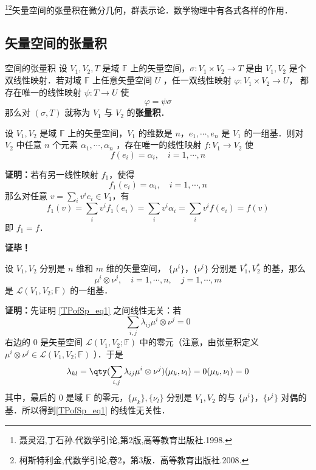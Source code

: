 

\footnote{聂灵沼,丁石孙.代数学引论,第2版,高等教育出版社.1998.}\footnote{柯斯特利金,代数学引论,卷2，第3版．高等教育出版社.2008.}矢量空间的张量积在微分几何，群表示论．数学物理中有各式各样的作用．
\subsection{矢量空间的张量积}
\begin{definition}{空间的张量积}\label{TPofSp_def1}
设 $V_1,V_2,T$ 是域 $\mathbb F$ 上的矢量空间，$\sigma:V_1\times V_2\rightarrow T$ 是由 $V_1,V_2$ 是个双线性映射．若对域 $\mathbb F$ 上任意矢量空间 $U$ ，任一双线性映射 $\varphi:V_1\times V_2\rightarrow U$， 都存在唯一的线性映射 $\psi:T\rightarrow U$ 使
\begin{equation}
\varphi=\psi\sigma
\end{equation}
那么对 $(\sigma,T)$ 就称为 $V_1$ 与 $V_2$ 的\textbf{张量积}．
\end{definition}

\begin{lemma}{}\label{TPofSp_lem2}
设 $V_1,V_2$ 是域 $\mathbb F$ 上的矢量空间，$V_1$ 的维数是 $n$，$e_1,\cdots,e_n$ 是 $V_1$ 的一组基．则对 $V_2$ 中任意 $n$ 个元素 $\alpha_1,\cdots,\alpha_n$ ，存在唯一的线性映射 $f:V_1\rightarrow V_2$ 使
\begin{equation}
f(e_i)=\alpha_i,\quad i=1,\cdots,n
\end{equation}
\end{lemma}
\textbf{证明：}若有另一线性映射 $f_1$，使得
\begin{equation}
f_1(e_i)=\alpha_i,\quad i=1,\cdots ,n
\end{equation}
那么对任意 $v=\sum\limits_{i}v^ie_i\in V_1$，有
\begin{equation}
f_1(v)=\sum_{i}v^if_1(e_i)=\sum_{i}v^i\alpha_i=\sum_{i}v^if(e_i)=f(v)
\end{equation}
即 $f_1=f$．

\textbf{证毕！}
\begin{lemma}{}\label{TPofSp_lem1}
设 $V_1,V_2$ 分别是 $n$ 维和 $m$ 维的矢量空间， $\{\mu^i\}$，$\{\nu^i\}$ 分别是 $V_1^*,V_2^*$ 的基，那么
\begin{equation}\label{TPofSp_eq1}
\mu^i\otimes\nu^j,\quad i=1,\cdots,n,\quad j=1,\cdots,m
\end{equation}
 是 $\mathcal L(V_1,V_2;\mathbb F)$ 的一组基．
\end{lemma}
\textbf{证明：}先证明 \autoref{TPofSp_eq1} 之间线性无关：若
\begin{equation}
\sum_{i,j}\lambda_{ij}\mu^i\otimes\nu^j=0
\end{equation}
右边的 $0$ 是矢量空间 $\mathcal L(V_1,V_2;\mathbb F)$
中的零元（注意，由张量积定义 $\mu^i\otimes\nu^j\in \mathcal L(V_1,V_2;\mathbb F)$ ）．于是
\begin{equation}
\lambda_{kl}=\qty(\sum_{i,j}\lambda_{ij}\mu^i\otimes\nu^j)(\mu_k,\nu_l)=0(\mu_k,\nu_l)=0
\end{equation}
其中，最后的 $0$ 是域 $\mathbb F$ 的零元，$\{\mu_k\},\{\nu_l\}$ 分别是 $V_1,V_2$ 的与 $\{\mu^i\}$，$\{\nu^i\}$ 对偶的基．所以得到\autoref{TPofSp_eq1} 的线性无关性．

